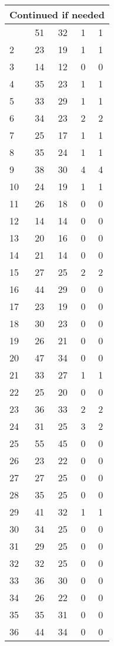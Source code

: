 \begin{center}
\begin{longtable}{l|c|c|c|c}
\hline \multicolumn{5}{|r|}{{Continued if needed}} \\ \hline
\endfoot 
1 & 51 & 32 & 1 & 1\\ \hline
2 & 23 & 19 & 1 & 1\\ \hline
3 & 14 & 12 & 0 & 0\\ \hline
4 & 35 & 23 & 1 & 1\\ \hline
5 & 33 & 29 & 1 & 1\\ \hline
6 & 34 & 23 & 2 & 2\\ \hline
7 & 25 & 17 & 1 & 1\\ \hline
8 & 35 & 24 & 1 & 1\\ \hline
9 & 38 & 30 & 4 & 4\\ \hline
10 & 24 & 19 & 1 & 1\\ \hline
11 & 26 & 18 & 0 & 0\\ \hline
12 & 14 & 14 & 0 & 0\\ \hline
13 & 20 & 16 & 0 & 0\\ \hline
14 & 21 & 14 & 0 & 0\\ \hline
15 & 27 & 25 & 2 & 2\\ \hline
16 & 44 & 29 & 0 & 0\\ \hline
17 & 23 & 19 & 0 & 0\\ \hline
18 & 30 & 23 & 0 & 0\\ \hline
19 & 26 & 21 & 0 & 0\\ \hline
20 & 47 & 34 & 0 & 0\\ \hline
21 & 33 & 27 & 1 & 1\\ \hline
22 & 25 & 20 & 0 & 0\\ \hline
23 & 36 & 33 & 2 & 2\\ \hline
24 & 31 & 25 & 3 & 2\\ \hline
25 & 55 & 45 & 0 & 0\\ \hline
26 & 23 & 22 & 0 & 0\\ \hline
27 & 27 & 25 & 0 & 0\\ \hline
28 & 35 & 25 & 0 & 0\\ \hline
29 & 41 & 32 & 1 & 1\\ \hline
30 & 34 & 25 & 0 & 0\\ \hline
31 & 29 & 25 & 0 & 0\\ \hline
32 & 32 & 25 & 0 & 0\\ \hline
33 & 36 & 30 & 0 & 0\\ \hline
34 & 26 & 22 & 0 & 0\\ \hline
35 & 35 & 31 & 0 & 0\\ \hline
36 & 44 & 34 & 0 & 0\\ \hline

\end{longtable}
\end{center}
